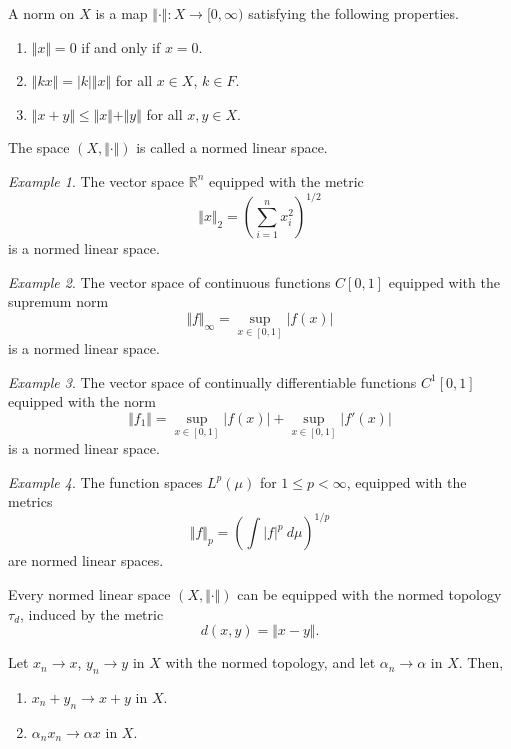\documentclass[11pt]{article}
\newcommand{\R}{\mathbb{R}}
\newcommand{\norm}[1]{\Vert #1 \Vert}
\theoremstyle{definition}
\theoremstyle{remark}
\newtheorem*{example}{Example}
\begin{document}
    \begin{definition}
        A norm on $X$ is a map $\norm{\cdot}\colon X \to [0, \infty)$ satisfying the
        following properties. \begin{enumerate}
            \item $\norm{x} = 0$ if and only if $x = 0$.
            \item $\norm{kx} = |k|\norm{x}$ for all $x \in X$, $k \in F$.
            \item $\norm{x + y} \leq \norm{x} + \norm{y}$ for all $x, y \in X$.
        \end{enumerate}
        The space $(X, \norm{\cdot})$ is called a normed linear space.
    \end{definition}
    \begin{example}
        The vector space $\R^n$ equipped with the metric \[
            \norm{x}_2 = \left(\sum_{i = 1}^n x_i^2\right)^{1 / 2}
        \] is a normed linear space.
    \end{example}
    \begin{example}
        The vector space of continuous functions $C[0, 1]$ equipped with the supremum
        norm \[
            \norm{f}_\infty = \sup_{x \in [0, 1]} |f(x)|
        \] is a normed linear space.
    \end{example}
    \begin{example}
        The vector space of continually differentiable functions $C^1[0, 1]$ equipped
        with the norm \[
            \norm{f_1 } = \sup_{x \in [0, 1]}|f(x)| + \sup_{x \in [0, 1]}|f'(x)|
        \] is a normed linear space.
    \end{example}
    \begin{example}
        The function spaces $L^p(\mu)$ for $1 \leq p < \infty$, equipped with the
        metrics \[
            \norm{f}_p = \left(\int |f|^p \:d\mu\right)^{1 / p}
        \] are normed linear spaces.
    \end{example}

    \begin{definition}
        Every normed linear space $(X, \norm{\cdot})$ can be equipped with the normed
        topology $\tau_d$, induced by the metric \[
            d(x, y) = \norm{x - y}.
        \]
    \end{definition}

    \begin{lemma}
        Let $x_n \to x$, $y_n \to y$ in $X$ with the normed topology, and let
        $\alpha_n \to \alpha$ in $X$. Then, \begin{enumerate}
            \item $x_n + y_n \to x + y$ in $X$.
            \item $\alpha_n x_n \to \alpha x$ in $X$.
        \end{enumerate}
    \end{lemma}
\end{document}

